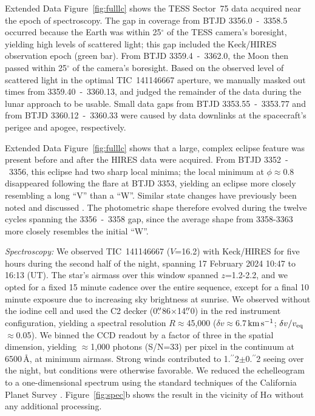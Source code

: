 \documentclass{nature3}
\newcommand{\farcs}{\mbox{\ensuremath{.\!\!^{\prime\prime}}}}%
\newcommand{\kms}{\ensuremath{\rm km\,s^{-1}}}
\begin{document}
\begin{methods}
Extended Data Figure~\ref{fig:fulllc} shows the TESS Sector~75 data
acquired near the epoch of spectroscopy.  The gap in coverage from
BTJD 3356.0~-~3358.5 occurred because the Earth was within
25$^\circ$ of the TESS camera's boresight, yielding high levels of
scattered light; this gap included the Keck/HIRES observation epoch
(green bar).  From BTJD 3359.4~-~3362.0, the Moon then passed within
25$^\circ$ of the camera's boresight.  Based on the observed level
of scattered light in the optimal TIC~141146667 aperture, we
manually masked out times from 3359.40~-~3360.13, and judged the
remainder of the data during the lunar approach to be usable.  Small
data gaps from BTJD 3353.55~-~3353.77 and from BTJD
3360.12~-~3360.33 were caused by data downlinks at the spacecraft's
perigee and apogee, respectively.

Extended Data Figure~\ref{fig:fulllc} shows that a large, complex
eclipse feature was present before and after the HIRES data were
acquired.  From BTJD 3352~-~3356, this eclipse had two sharp local
minima;  the local minimum at $\phi$$\approx$0.8 disappeared
following the flare at BTJD 3353, yielding an eclipse more closely
resembling a long ``V'' than a ``W''.  Similar state changes have
previously been noted and discussed \cite{Stauffer2017,Bouma2024}.
The photometric shape therefore evolved during the twelve cycles
spanning the 3356~-~3358 gap, since the average shape from 3358-3363
more closely resembles the initial ``W''.



{\it Spectroscopy:}
We observed TIC~141146667 ($V$=16.2) with Keck/HIRES for five hours
during the second half of the night, spanning 17 February 2024 10:47
to 16:13 (UT).  The star's airmass over this window spanned
$z$=1.2-2.2, and we opted for a fixed 15 minute cadence over the
entire sequence, except for a final 10 minute exposure due to
increasing sky brightness at sunrise.  We observed without the iodine
cell and used the C2 decker (0$\farcs$86$\times$14$\farcs$0) in the
red instrument configuration, yielding a spectral resolution
$R$$\approx$45{,}000 ($\delta v$$\approx$6.7\,\kms; $\delta v / v_{\rm
eq}$$\approx$0.05).  We binned the CCD readout by a factor of three in
the spatial dimension, yielding $\approx$1,000 photons (S/N=33) per
pixel in the continuum at 6500\,\AA, at minimum airmass.  Strong winds
contributed to 1\farcs2$\pm$0\farcs2 seeing over the night, but
conditions were otherwise favorable.  We reduced the echelleogram to a
one-dimensional spectrum using the standard techniques of the
California Planet Survey \cite{Howard2010}.  Figure~\ref{fig:spec}b
shows the result in the vicinity of H$\alpha$ without any additional
processing.



\end{methods}
\end{document}
